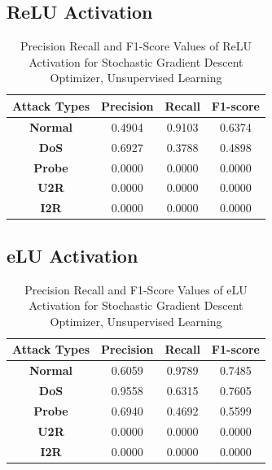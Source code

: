 \documentclass[12pt, a4paper]{report}
\begin{document}
\begin{appendices}
  
  \subsection{ReLU Activation}
  \begin{table}[h]
		\centering
		\captionsetup{justification=centering,margin=2cm}
		\begin{tabular}{|c|c|c|c|}
		\hline
		\textbf{Attack Types} & \textbf{Precision} & \textbf{Recall} & \textbf{F1-score} \\ \hline
		\textbf{Normal}       & 0.4904             & 0.9103          & 0.6374            \\ \hline
		\textbf{DoS}          & 0.6927             & 0.3788          & 0.4898            \\ \hline
		\textbf{Probe}        & 0.0000             & 0.0000          & 0.0000            \\ \hline
		\textbf{U2R}          & 0.0000             & 0.0000          & 0.0000            \\ \hline
		\textbf{I2R}          & 0.0000             & 0.0000          & 0.0000            \\ \hline
		\end{tabular}
		\caption{Precision Recall and F1-Score Values of ReLU Activation for Stochastic Gradient Descent Optimizer, Unsupervised Learning}
		\label{classification ReLU sgd tf}
		\end{table} 

   \subsection{eLU Activation}
  \begin{table}[h]
		\centering
		\captionsetup{justification=centering,margin=2cm}
		\begin{tabular}{|c|c|c|c|}
		\hline
		\textbf{Attack Types} & \textbf{Precision} & \textbf{Recall} & \textbf{F1-score} \\ \hline
		\textbf{Normal}       & 0.6059             & 0.9789          & 0.7485            \\ \hline
		\textbf{DoS}          & 0.9558             & 0.6315          & 0.7605            \\ \hline
		\textbf{Probe}        & 0.6940             & 0.4692          & 0.5599            \\ \hline
		\textbf{U2R}          & 0.0000             & 0.0000          & 0.0000            \\ \hline
		\textbf{I2R}          & 0.0000             & 0.0000          & 0.0000            \\ \hline
		\end{tabular}
		\caption{Precision Recall and F1-Score Values of eLU Activation for Stochastic Gradient Descent Optimizer, Unsupervised Learning}
		\label{classification eLU sgd tf}
		\end{table} 
  \clearpage

\end{appendices}
\end{document}
